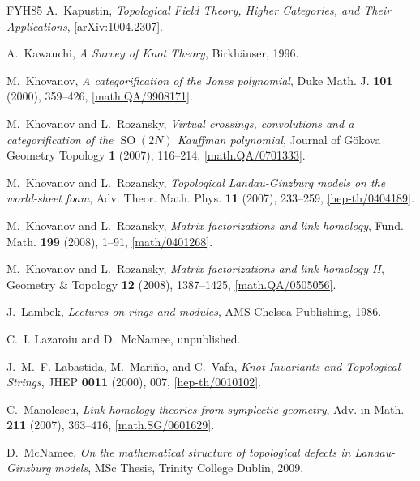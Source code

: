 \documentclass{compositio}
\theoremstyle{definition}
\numberwithin{equation}{section}
\begin{document}
\begin{thebibliography}{FYH{\etalchar{+}}85}
A.~Kapustin, \emph{Topological {F}ield {T}heory, {H}igher {C}ategories, and
  {T}heir {A}pplications},
  \href{http://arxiv.org/abs/1004.2307}{[arXiv:1004.2307]}.

A.~Kawauchi, \emph{A {S}urvey of {K}not {T}heory}, Birkh\"auser, 1996.

M.~Khovanov, \emph{A categorification of the {J}ones polynomial}, Duke Math. J.
  \textbf{101} (2000), 359--426,
  \href{http://arxiv.org/abs/math/9908171}{[math.QA/9908171]}.

M.~Khovanov and L.~Rozansky, \emph{Virtual crossings, convolutions and a
  categorification of the {$\operatorname{SO}(2N)$} {K}auffman polynomial},
  Journal of G\"okova Geometry Topology \textbf{1} (2007), 116--214,
  \href{http://arxiv.org/abs/math/0701333}{[math.QA/0701333]}.

M.~Khovanov and L.~Rozansky, \emph{Topological Landau-Ginzburg models on the world-sheet foam},
  Adv. Theor. Math. Phys. \textbf{11} (2007), 233--259,
  \href{http://arxiv.org/abs/hep-th/0404189}{[hep-th/0404189]}.

M.~Khovanov and L.~Rozansky, \emph{Matrix factorizations and link homology}, Fund. Math.
  \textbf{199} (2008), 1--91,
  \href{http://arxiv.org/abs/math/0401268}{[math/0401268]}.

M.~Khovanov and L.~Rozansky, \emph{Matrix factorizations and link homology {II}}, Geometry \&
  Topology \textbf{12} (2008), 1387--1425,
  \href{http://arxiv.org/abs/math/0505056}{[math.QA/0505056]}.

J.~Lambek, \emph{Lectures on rings and modules}, AMS Chelsea Publishing, 1986.

C.~I. Lazaroiu and D.~McNamee, unpublished.

J.~M.~F. Labastida, M.~Mari\~{n}o, and C.~Vafa, \emph{Knot {I}nvariants and
  {T}opological {S}trings}, JHEP \textbf{0011} (2000), 007,
  \href{http://arxiv.org/abs/hep-th/0010102}{[hep-th/0010102]}.

C.~Manolescu, \emph{Link homology theories from symplectic geometry}, Adv. in
  Math. \textbf{211} (2007), 363--416,
  \href{http://www.arxiv.org/abs/math.AG/0601629}{[math.SG/0601629]}.

D.~McNamee, \emph{On the mathematical structure of topological defects in
  {L}andau-{G}inzburg models}, MSc Thesis, Trinity College Dublin, 2009.


\end{thebibliography}
\end{document}
